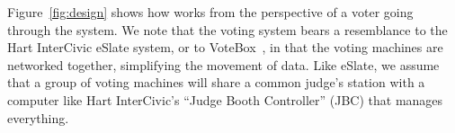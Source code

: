 \label{sec:voterflow}

\begin{figure*}
\caption{The design of the \projname system. Green objects are computers, white objects are paper records, and other objects are shaded in gray. Arrows display the flow of information; green for digital information, black for paper, and dashed lines indicate that the flow is contingent on voter choice.\label{fig:design}.}
\end{figure*}

Figure~\ref{fig:design} shows how \projname works from the perspective
of a voter going through the system. We note that the \projname voting system bears a resemblance to the Hart InterCivic eSlate system, or to VoteBox~\cite{votebox}, in that the voting machines are networked together, simplifying the movement of data. Like eSlate, we assume that a group of voting machines will share a common judge's station with a computer like Hart InterCivic's ``Judge Booth Controller'' (JBC) that manages everything. 

